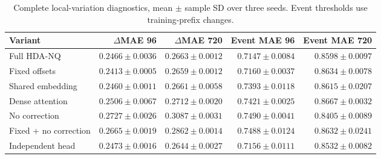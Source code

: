 \begin{table}[t]
\centering\small
\caption{Complete local-variation diagnostics, mean $\pm$ sample SD over three seeds. Event thresholds use training-prefix changes.}
\label{tab:detail-ablation}
\begin{tabular}{@{}lrrrr@{}}
\toprule
Variant & $\Delta$MAE 96 & $\Delta$MAE 720 & Event MAE 96 & Event MAE 720 \\
\midrule
Full HDA-NQ & $0.2466\pm0.0036$ & $0.2663\pm0.0012$ & $0.7147\pm0.0084$ & $0.8598\pm0.0097$ \\
Fixed offsets & $0.2413\pm0.0005$ & $0.2659\pm0.0012$ & $0.7160\pm0.0037$ & $0.8634\pm0.0078$ \\
Shared embedding & $0.2460\pm0.0011$ & $0.2661\pm0.0058$ & $0.7393\pm0.0118$ & $0.8615\pm0.0207$ \\
Dense attention & $0.2506\pm0.0067$ & $0.2712\pm0.0020$ & $0.7421\pm0.0025$ & $0.8667\pm0.0032$ \\
No correction & $0.2727\pm0.0026$ & $0.3087\pm0.0031$ & $0.7490\pm0.0041$ & $0.8405\pm0.0089$ \\
Fixed + no correction & $0.2665\pm0.0019$ & $0.2862\pm0.0014$ & $0.7488\pm0.0124$ & $0.8632\pm0.0241$ \\
Independent head & $0.2473\pm0.0016$ & $0.2644\pm0.0027$ & $0.7156\pm0.0111$ & $0.8532\pm0.0082$ \\
\bottomrule
\end{tabular}
\end{table}
